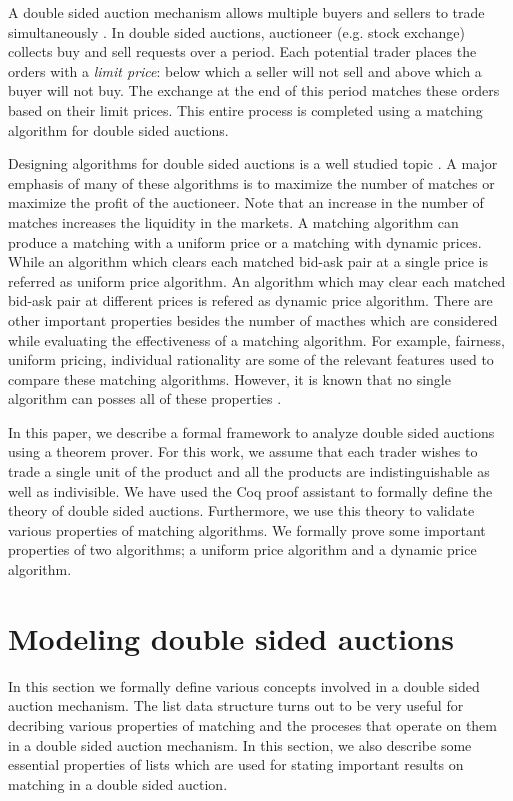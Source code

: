\documentclass[a4paper,UKenglish,cleveref, autoref]{lipics-v2019}
\begin{document}
A double sided auction mechanism allows multiple buyers and sellers to trade simultaneously \cite{friedman}. In double sided auctions,  auctioneer (e.g. stock exchange) collects buy and sell requests over a period. Each potential trader places the orders with a \emph{limit price}: below which a seller will not sell and above which a buyer will not buy. The exchange at the end of this period matches these orders based on their limit prices. This entire process is completed using a matching algorithm for double sided auctions.  

Designing algorithms for double sided auctions is a well studied topic \cite{mcafee1992, WurmanWW98,NiuP13, ZhaoZKP10}.  A major emphasis of many of these algorithms is to maximize the number of matches or maximize the profit of the auctioneer. Note that an increase in the number of matches increases the liquidity in the markets. A matching algorithm can produce a matching with a uniform price or a matching with dynamic prices. While an algorithm which clears each matched bid-ask pair at a single price is referred as uniform price algorithm.  An algorithm which may clear each matched bid-ask pair at different prices is refered as  dynamic price algorithm. There are other important properties besides the number of macthes which are considered while evaluating the effectiveness of a matching algorithm. For example, fairness, uniform pricing, individual rationality are some of the relevant features used to compare these matching algorithms. However, it is known that no single algorithm can posses all of these properties \cite{WurmanWW98,mcafee1992}. 

In this paper, we describe a formal framework to analyze double sided auctions using a theorem prover.  For this work, we assume that each trader wishes to trade a single unit of the product and all the products are indistinguishable as well as indivisible. We have used the Coq proof assistant to formally  define the theory of double sided auctions.  Furthermore, we use this theory to validate various properties of matching algorithms. We formally prove some important properties of two algorithms; a uniform price algorithm and a dynamic price algorithm. 

\section{Modeling double sided auctions}
In this section we formally define various concepts involved in a double sided auction mechanism. The list data structure turns out to be very useful for decribing various properties of matching and the proceses that operate on them in a double sided auction mechanism. In this section, we also describe some essential properties of lists which are used for stating important results on matching in a double sided auction. 
\end{document}
